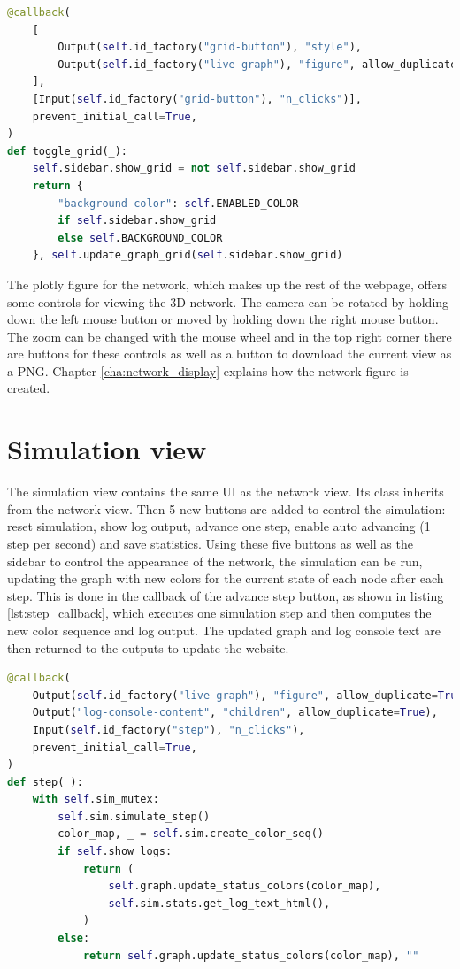 \begin{lstlisting}[language=python, caption={Callback for toggling the grid}, label={lst:grid_callback}]
@callback(
    [
        Output(self.id_factory("grid-button"), "style"),
        Output(self.id_factory("live-graph"), "figure", allow_duplicate=True),
    ],
    [Input(self.id_factory("grid-button"), "n_clicks")],
    prevent_initial_call=True,
)
def toggle_grid(_):
    self.sidebar.show_grid = not self.sidebar.show_grid
    return {
        "background-color": self.ENABLED_COLOR
        if self.sidebar.show_grid
        else self.BACKGROUND_COLOR
    }, self.update_graph_grid(self.sidebar.show_grid)
\end{lstlisting}

The plotly figure for the network, which makes up the rest of the webpage, offers some controls for viewing the 3D network. The camera can be rotated by holding down the left mouse button or moved by holding down the right mouse button. The zoom can be changed with the mouse wheel and in the top right corner there are buttons for these controls as well as a button to download the current view as a PNG. Chapter \ref{cha:network_display} explains how the network figure is created.

\section{Simulation view}
The simulation view contains the same UI as the network view. Its class inherits from the network view. Then 5 new buttons are added to control the simulation: reset simulation, show log output, advance one step, enable auto advancing (1 step per second) and save statistics. Using these five buttons as well as the sidebar to control the appearance of the network, the simulation can be run, updating the graph with new colors for the current state of each node after each step. This is done in the callback of the advance step button, as shown in listing \ref{lst:step_callback}, which executes one simulation step and then computes the new color sequence and log output. The updated graph and log console text are then returned to the outputs to update the website.

\begin{lstlisting}[language=python, caption={Callback for advancing simulaton by one step}, label={lst:step_callback}]
@callback(
    Output(self.id_factory("live-graph"), "figure", allow_duplicate=True),
    Output("log-console-content", "children", allow_duplicate=True),
    Input(self.id_factory("step"), "n_clicks"),
    prevent_initial_call=True,
)
def step(_):
    with self.sim_mutex:
        self.sim.simulate_step()
        color_map, _ = self.sim.create_color_seq()
        if self.show_logs:
            return (
                self.graph.update_status_colors(color_map),
                self.sim.stats.get_log_text_html(),
            )
        else:
            return self.graph.update_status_colors(color_map), ""
\end{lstlisting}

